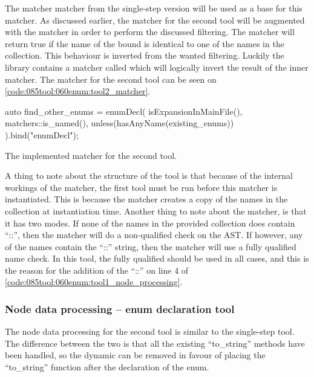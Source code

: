 The matcher  matcher from the single-step version will be used as a base for this matcher. 
As discussed earlier, the matcher for the second tool will be augmented with the  matcher in order to perform the discussed filtering.
The  matcher will return true if the name of the bound  is identical to one of the names in the collection. 
This behaviour is inverted from the wanted filtering. 
Luckily the library contains a matcher called  which will logically invert the result of the inner matcher. The matcher for the second tool can be seen on \cref{code:085tool:060enum:tool2_matcher}.

\begin{listing}[H]
  \begin{cppcode}
auto find_other_enums = enumDecl(
    isExpansionInMainFile(),
    matchers::is_named(),
    unless(hasAnyName(existing_enums))
  ).bind("enumDecl");
  \end{cppcode}
  \caption{The implemented matcher for the second tool.}
  \label{code:085tool:060enum:tool2_matcher}
\end{listing}

A thing to note about the structure of the tool is that because of the internal workings of the  matcher, the first tool must be run before this matcher is instantiated. This is because the matcher creates a copy of the names in the collection at instantiation time.
Another thing to note about the  matcher, is that it has two modes. If none of the names in the provided collection does contain ``::'', then the matcher will do a non-qualified check on the AST. If however, any of the names contain the ``::'' string, then the matcher will use a fully qualified name check. In this tool, the fully qualified should be used in all cases, and this is the reason for the addition of the ``::'' on line 4 of \cref{code:085tool:060enum:tool1_node_processing}.

\subsubsection*{Node data processing -- enum declaration tool}

The node data processing for the second tool is similar to the single-step tool. The difference between the two is that all the existing ``to\_string'' methods have been handled, so the dynamic  can be removed in favour of placing the ``to\_string'' function after the declaration of the enum.

